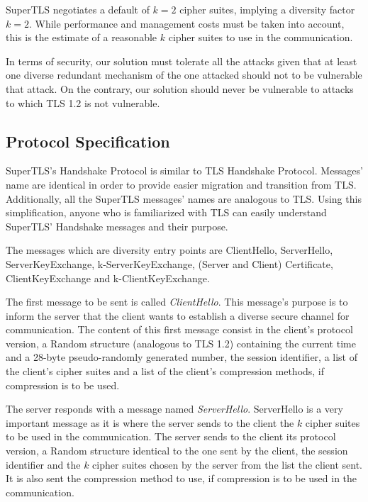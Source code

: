 \documentclass{sig-alternate-05-2015}
\begin{document}
SuperTLS negotiates a default of $k = 2$ cipher suites, implying a diversity factor $k = 2$. While performance and management costs must be taken into account, this is the estimate of a reasonable $k$ cipher suites to use in the communication.

%

In terms of security, our solution must tolerate all the attacks given that at least one diverse redundant mechanism of the one attacked should not to be vulnerable that attack. On the contrary, our solution should never be vulnerable to attacks to which TLS 1.2 is not vulnerable.

\subsection{Protocol Specification}

SuperTLS's Handshake Protocol is similar to TLS Handshake Protocol. Messages' name are identical in order to provide easier migration and transition from TLS. Additionally, all the SuperTLS messages' names are analogous to TLS. Using this simplification, anyone who is familiarized with TLS can easily understand SuperTLS' Handshake messages and their purpose.

The messages which are diversity entry points are ClientHello, ServerHello, ServerKeyExchange, k-ServerKeyExchange, (Server and Client) Certificate, ClientKeyExchange and k-ClientKeyExchange.

The first message to be sent is called \textit{ClientHello}. This message's purpose is to inform the server that the client wants to establish a diverse secure channel for communication. The content of this first message consist in the client's protocol version, a Random structure (analogous to TLS 1.2) containing the current time and a 28-byte pseudo-randomly generated number, the session identifier, a list of the client's cipher suites and a list of the client's compression methods, if compression is to be used.

The server responds with a message named \textit{ServerHello}. ServerHello is a very important message as it is where the server sends to the client the $k$ cipher suites to be used in the communication. The server sends to the client its protocol version, a Random structure identical to the one sent by the client, the session identifier and the $k$ cipher suites chosen by the server from the list the client sent. It is also sent the compression method to use, if compression is to be used in the communication.
\end{document}
